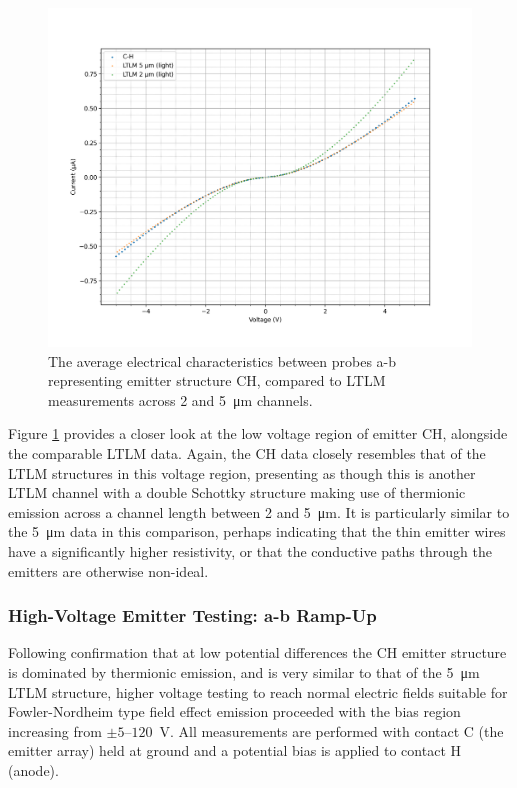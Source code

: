\begin{refsection}
\begin{figure}[H]
    \centering
    \includegraphics[width=\linewidth]{Chapter7/Figs/Raster/Emitters/5V comparison to LTLM.png}
    \caption{The average electrical characteristics between probes a-b representing emitter structure CH, compared to LTLM measurements across 2 and 5~\si{\micro\metre} channels.}
    \label{fig:e_ch_5v_ltlm}
\end{figure}

Figure \ref{fig:e_ch_5v_ltlm} provides a closer look at the low voltage region of emitter CH, alongside the comparable LTLM data. Again, the CH data closely resembles that of the LTLM structures in this voltage region, presenting as though this is another LTLM channel with a double Schottky structure making use of thermionic emission across a channel length between 2 and 5~\si{\micro\metre}. It is particularly similar to the 5~\si{\micro\metre} data in this comparison, perhaps indicating that the thin emitter wires have a significantly higher resistivity, or that the conductive paths through the emitters are otherwise non-ideal.

\subsubsection{High-Voltage Emitter Testing: a-b Ramp-Up}
Following confirmation that at low potential differences the CH emitter structure is dominated by thermionic emission, and is very similar to that of the 5~\si{\micro\metre} LTLM structure, higher voltage testing to reach normal electric fields suitable for Fowler-Nordheim type field effect emission proceeded with the bias region increasing from $\pm5$--$120$~\si{\volt}. All measurements are performed with contact C (the emitter array) held at ground and a potential bias is applied to contact H (anode).


\end{refsection}
